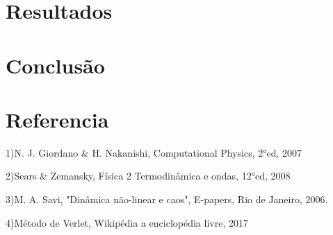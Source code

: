 \documentclass[dvipsnames,a4paper,12pt]{article}
\begin{document}
\section{Resultados}



\section{Conclus\~ao}



\section{Referencia}

\noindent 

1)N. J. Giordano \& H. Nakanishi, Computational Physics, 2°ed, 2007

2)Sears \& Zemansky, F\'isica 2 Termodinâmica e ondas, 12°ed, 2008

3)M. A. Savi, "Din\^amica n\~ao-linear e caos", E-papers, Rio de Janeiro, 2006.

4)M\'etodo de Verlet, Wikip\'edia a enciclop\'edia livre, 2017
\end{document}
